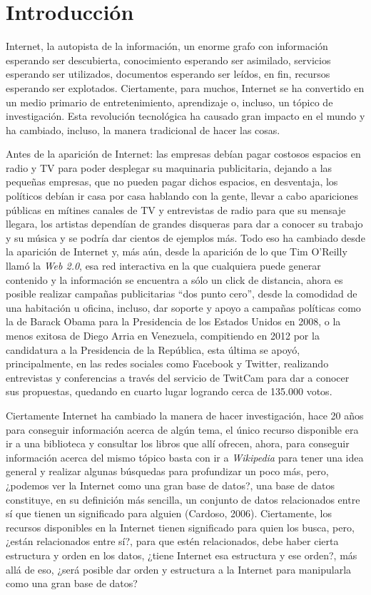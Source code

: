 \chapter*{Introducci\'on}
\label{chap:introduccion}

Internet, la autopista de la información, un enorme grafo con información esperando ser descubierta, conocimiento esperando ser asimilado, servicios esperando ser utilizados, documentos esperando ser leídos, en fin, recursos esperando ser explotados. Ciertamente, para muchos, Internet se ha convertido en un medio primario de entretenimiento, aprendizaje o, incluso, un tópico de investigación. Esta revolución tecnológica ha causado gran impacto en el mundo y ha cambiado, incluso, la manera tradicional de hacer las cosas.

Antes de la aparición de Internet: las empresas debían pagar costosos espacios en radio y TV para poder desplegar su maquinaria publicitaria, dejando a las pequeñas empresas, que no pueden pagar dichos espacios, en desventaja, los políticos debían ir casa por casa hablando con la gente, llevar a cabo apariciones públicas en mítines canales de TV y entrevistas de radio para que su mensaje llegara, los artistas dependían de grandes disqueras para dar a conocer su trabajo y su música y se podría dar cientos de ejemplos más. Todo eso ha cambiado desde la aparición de Internet y, más aún, desde la aparición de lo que Tim O'Reilly llamó la \textit{Web 2.0}, esa red interactiva en la que cualquiera puede generar contenido y la información se encuentra a sólo un click de distancia, ahora es posible realizar campañas publicitarias ``dos punto cero'', desde la comodidad de una habitación u oficina, incluso, dar soporte y apoyo a campañas políticas como la de Barack Obama para la Presidencia de los Estados Unidos en 2008, o la menos exitosa de Diego Arria en Venezuela, compitiendo en 2012 por la candidatura a la Presidencia de la República, esta última se apoyó, principalmente, en las redes sociales como Facebook y Twitter, realizando entrevistas y conferencias a través del servicio de TwitCam para dar a conocer sus propuestas, quedando en cuarto lugar logrando cerca de 135.000 votos.

Ciertamente Internet ha cambiado la manera de hacer investigación, hace 20 años para conseguir información acerca de algún tema, el único recurso disponible era ir a una biblioteca y consultar los libros que allí ofrecen, ahora, para conseguir información acerca del mismo tópico basta con ir a \textit{Wikipedia} para tener una idea general y realizar algunas búsquedas para profundizar un poco más, pero, ¿podemos ver la Internet como una gran base de datos?, una base de datos constituye, en su definición más sencilla, un conjunto de datos relacionados entre sí que tienen un significado para alguien (Cardoso, 2006). Ciertamente, los recursos disponibles en la Internet tienen significado para quien los busca, pero, ¿están relacionados entre sí?, para que estén relacionados, debe haber cierta estructura y orden en los datos, ¿tiene Internet esa estructura y ese orden?, más allá de eso, ¿será posible dar orden y estructura a la Internet para manipularla como una gran base de datos?

